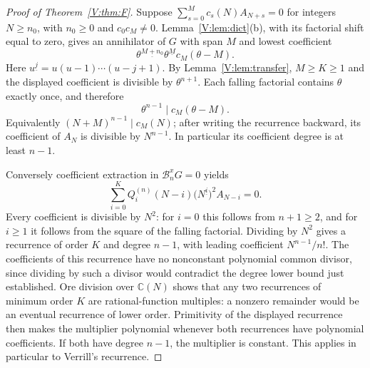 \documentclass[11pt,a4paper]{article}
\theoremstyle{definition}
\theoremstyle{remark}
\numberwithin{equation}{section}
\begin{document}
\begin{proof}[Proof of Theorem~\ref{V:thm:F}]
Suppose $\sum_{s=0}^{M}c_s(N)A_{N+s}=0$ for integers $N\ge n_0$,
with $n_0\ge0$ and $c_0c_M\ne0$.
Lemma~\ref{V:lem:dict}(b), with its factorial shift equal to zero,
gives an annihilator of $G$ with span $M$ and lowest coefficient
\[
 \theta^{\underline{M+n_0}}\theta^{\underline M}c_M(\theta-M).
\]
Here $u^{\underline j}=u(u-1)\cdots(u-j+1)$.
By Lemma~\ref{V:lem:transfer}, $M\ge K\ge1$ and the displayed
coefficient is divisible by $\theta^{n+1}$.
Each falling factorial contains $\theta$ exactly once, and therefore
\[
 \theta^{n-1}\mid c_M(\theta-M).
\]
Equivalently $(N+M)^{n-1}\mid c_M(N)$; after writing the recurrence
backward, its coefficient of $A_N$ is divisible by $N^{n-1}$.
In particular its coefficient degree is at least $n-1$.

Conversely coefficient extraction in $\mathcal B_n^xG=0$ yields
\[
 \sum_{i=0}^{K}Q_i^{(n)}(N-i)
       \bigl(N^{\underline i}\bigr)^2 A_{N-i}=0.
\]
Every coefficient is divisible by $N^2$: for $i=0$ this follows from
$n+1\ge2$, and for $i\ge1$ it follows from the square of the falling
factorial. Dividing by $N^2$ gives a recurrence of order $K$ and
degree $n-1$, with leading coefficient $N^{n-1}/n!$.
The coefficients of this recurrence have no nonconstant polynomial
common divisor, since dividing by such a divisor would contradict
the degree lower bound just established.
Ore division over $\mathbb C(N)$ shows that any two recurrences of
minimum order $K$ are rational-function multiples: a nonzero
remainder would be an eventual recurrence of lower order.
Primitivity of the displayed recurrence then makes the multiplier
polynomial whenever both recurrences have polynomial coefficients.
If both have degree $n-1$, the multiplier is constant.
This applies in particular to Verrill's recurrence.
\end{proof}
\end{document}
